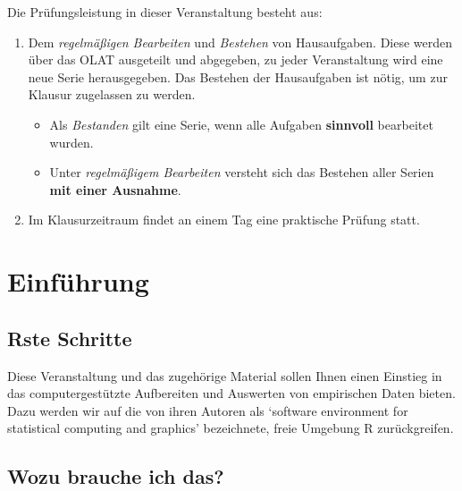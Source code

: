 \documentclass[
]{book}
\providecommand{\tightlist}{%
  \setlength{\itemsep}{0pt}\setlength{\parskip}{0pt}}
\begin{document}
Die Prüfungsleistung in dieser Veranstaltung besteht aus:

\begin{enumerate}
\def\labelenumi{\arabic{enumi}.}
\tightlist
\item
  Dem \emph{regelmäßigen Bearbeiten} und \emph{Bestehen} von Hausaufgaben. Diese werden über das OLAT ausgeteilt und abgegeben, zu jeder Veranstaltung wird eine neue Serie herausgegeben. Das Bestehen der Hausaufgaben ist nötig, um zur Klausur zugelassen zu werden.

  \begin{itemize}
  \tightlist
  \item
    Als \emph{Bestanden} gilt eine Serie, wenn alle Aufgaben \textbf{sinnvoll} bearbeitet wurden.
  \item
    Unter \emph{regelmäßigem Bearbeiten} versteht sich das Bestehen aller Serien \textbf{mit einer Ausnahme}. \medskip  
  \end{itemize}
\item
  Im Klausurzeitraum findet an einem Tag eine praktische Prüfung statt.
\end{enumerate}

\hypertarget{einfuxfchrung}{%
\section{Einführung}\label{einfuxfchrung}}

\hypertarget{rste-schritte}{%
\subsection*{Rste Schritte}\label{rste-schritte}}

Diese Veranstaltung und das zugehörige Material sollen Ihnen einen Einstieg in das computergestützte Aufbereiten und Auswerten von empirischen Daten bieten.
Dazu werden wir auf die von ihren Autoren als `software environment for statistical computing and graphics' bezeichnete, freie Umgebung R zurückgreifen.

\hypertarget{wozu-brauche-ich-das}{%
\subsection*{Wozu brauche ich das?}\label{wozu-brauche-ich-das}}
\end{document}
